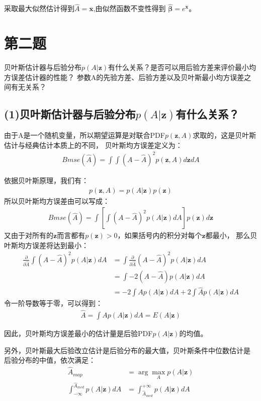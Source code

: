 \documentclass[fontset=windows]{article}
\numberwithin{figure}{section}
\begin{document}
采取最大似然估计得到\(\hat{A}=\overline{\mathbf{x}}\),由似然函数不变性得到
\(\hat{\boldsymbol{\beta}}=e^{\overline{\mathbf{x}}}\)。

\section{第二题}
贝叶斯估计器与后验分布\(p(A|\mathbf{z})\)有什么关系？是否可以用后验方差来评价最小均方误差估计器的性能？
参数A的先验方差、后验方差以及贝叶斯最小均方误差之间有无关系？

\subsection*{(1)贝叶斯估计器与后验分布\(p(A|\mathbf{z})\)有什么关系？}
由于A是一个随机变量，所以期望运算是对联合PDF\(p(\mathbf{z},A)\)求取的，这是贝叶斯估计与经典估计本质上的不同，
贝叶斯均方误差定义为：
\begin{align*}
	Bmse(\hat{A})=\int\int(A-\hat{A})^2 p(\mathbf{z},A)d\mathbf{z}dA
\end{align*}

依据贝叶斯原理，我们有：
\begin{align*}
	p(\mathbf{z},A)=p(A|\mathbf{z})p(\mathbf{z})
\end{align*}
所以贝叶斯均方误差由可以写成：
\begin{align*}
	Bmse(\hat{A})=\int \left[\int (A-\hat{A})^2 p(A|\mathbf{z})dA\right]p(\mathbf{z})d\mathbf{z}
\end{align*}
又由于对所有的\(\mathbf{z}\)而言都有\(p(\mathbf{z})>0\)，如果括号内的积分对每个\(\mathbf{z}\)都最小，
那么贝叶斯均方误差将达到最小：
\begin{align*}
	\frac{\partial}{\partial \hat{A}}\int (A-\hat{A})^2 p(A|\mathbf{z})dA
	 & =\int \frac{\partial}{\partial \hat{A}}(A-\hat{A})^2 p(A|\mathbf{z})dA \\
	 & =\int -2(A-\hat{A})p(A|\mathbf{z})dA                                   \\
	 & =-2\int Ap(A|\mathbf{z})dA+2\int \hat{A}p(A|\mathbf{z})dA
\end{align*}
令一阶导数等于零，可以得到：
\begin{align*}
	\hat{A}=\int Ap(A|\mathbf{z})dA=E(A|\mathbf{z})
\end{align*}

因此，贝叶斯均方误差最小的估计量是后验PDF\(p(A|\mathbf{z})\)的均值。

另外，贝叶斯最大后验改立估计是后验分布的最大值，贝叶斯条件中位数估计是
后验分布的中值，依次满足：
\begin{align*}
	\hat{A}_{map} & =\arg \underset{A}{\max} p(A|\mathbf{z})          \\
	\int_{-\infty}^{\hat{A}_{med}} p(A|\mathbf{z})dA
	              & =\int^{+\infty}_{\hat{A}_{med}} p(A|\mathbf{z})dA
\end{align*}
\end{document}
